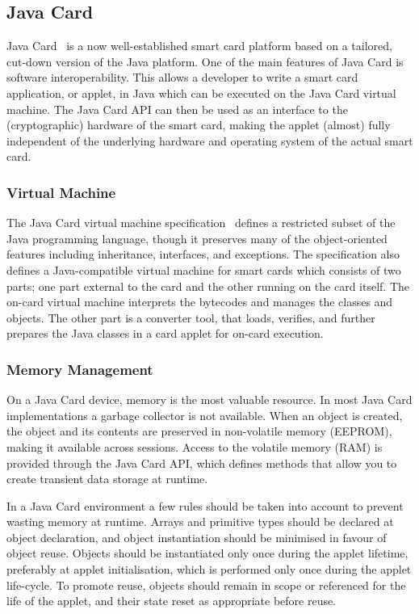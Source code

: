 \subsection{Java Card}\label{sec:javacard}

Java Card~\cite{Chen00} is a now well-established smart card platform based on
a tailored, cut-down version of the Java platform. One of the main features of
Java Card is software interoperability. This allows a developer to write a smart
card application, or applet, in Java which can be executed on the Java Card
virtual machine. The Java Card API can then be used as an interface to the
(cryptographic) hardware of the smart card, making the applet (almost) fully
independent of the underlying hardware and operating system of the actual smart
card.

\subsubsection{Virtual Machine}

The Java Card virtual machine specification~\cite{jcvm222} defines a restricted
subset of the Java programming language, though it preserves many of the
object-oriented features including inheritance, interfaces, and exceptions. The
specification also defines a Java-compatible virtual machine for smart cards
which consists of two parts; one part external to the card and the other running
on the card itself. The on-card virtual machine interprets the bytecodes and
manages the classes and objects. The other part is a converter tool, that loads,
verifies, and further prepares the Java classes in a card applet for on-card
execution.

\subsubsection{Memory Management}

On a Java Card device, memory is the most valuable resource. In most Java Card
implementations a garbage collector is not available. When an object is
created, the object and its contents are preserved in non-volatile memory
(EEPROM), making it available across sessions. Access to the volatile memory
(RAM) is provided through the Java Card API, which defines methods that allow
you to create transient data storage at runtime.

In a Java Card environment a few rules should be taken into account to prevent
wasting memory at runtime. Arrays and primitive types should be declared at
object declaration, and object instantiation should be minimised in favour of
object reuse. Objects should be instantiated only once during the applet
lifetime, preferably at applet initialisation, which is performed only once
during the applet life-cycle. To promote reuse, objects should remain in scope
or referenced for the life of the applet, and their state reset as appropriate
before reuse.

